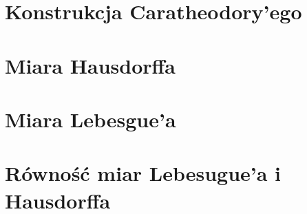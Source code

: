 
\section{Konstrukcja Caratheodory'ego}

\bigbreak

\bigbreak


\section{Miara Hausdorffa}

\bigbreak

\bigbreak

\bigbreak

\bigbreak

\section{Miara Lebesgue'a}

\bigbreak

\bigbreak

\bigbreak

\section{Równość miar Lebesugue'a i Hausdorffa}
% 
% 
% 

\bigbreak

\bigbreak